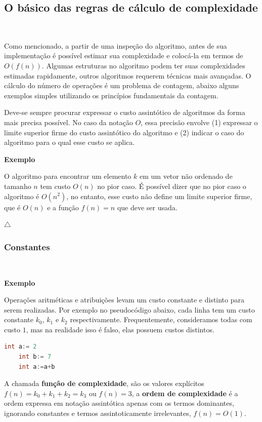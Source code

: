 \subsection{O básico das regras de cálculo de complexidade}
\

Como mencionado, a partir de uma inspeção do algoritmo, antes de sua implementação é possível estimar sua complexidade e colocá-la em termos de $O(f(n))$. Algumas estruturas no algoritmo podem ter suas complexidades estimadas rapidamente, outros algoritmos requerem técnicas mais avançadas. O cálculo do número de operações é um problema de contagem, abaixo alguns exemplos simples utilizando os princípios fundamentais da contagem.

Deve-se sempre procurar expressar o custo assintótico de algoritmos da forma mais precisa possível. No caso da notação $O$, essa precisão envolve (1) expressar o limite superior firme do custo assintótico do algoritmo e (2) indicar o caso do algoritmo para o qual esse custo se aplica.

\textbf{Exemplo}

O algoritmo para encontrar um elemento $k$ em um vetor não ordenado de tamanho $n$ tem custo $O(n)$ no pior caso. É possível dizer que no pior caso o algoritmo é $O(n^2)$, no entanto, esse custo não define um limite superior firme, que é $O(n)$ e a função $f(n)=n$ que deve ser usada.

{\raggedleft $\bigtriangleup$ \par}

\subsubsection{Constantes}
\

\textbf{Exemplo}

Operações aritméticas e atribuições levam um custo constante e distinto para serem realizadas. Por exemplo no pseudocódigo abaixo, cada linha tem um custo constante $k_0$, $k_1$ e $k_2$ respectivamente. Frequentemente, consideramos todas com custo $1$, mas na realidade isso é falso, elas possuem custos distintos.

\begin{lstlisting}[language=C, frame=single]
    int a:= 2
    int b:= 7
    int a:=a+b
\end{lstlisting}

A chamada \textbf{função de complexidade}, são os valores explícitos $f(n)=k_0+k_1+k_2=k_3$ ou $f(n)=3$, a \textbf{ordem de complexidade} é a ordem expressa em notação assintótica apenas com os termos dominantes, ignorando constantes e termos assintoticamente irrelevantes, $f(n)=O(1)$.

